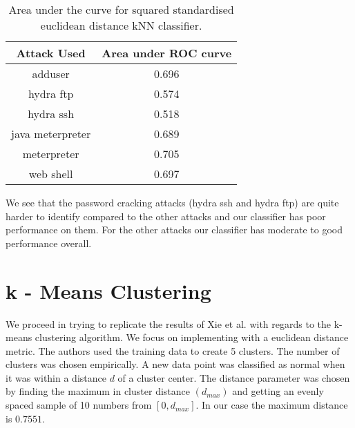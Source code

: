 \documentclass[reqno,openany,12pt]{amsbook}
\begin{document}
\begin{table}
\begin{tabular}{|c|c|}
\hline
Attack Used &  Area under ROC curve \\ \hline 
adduser          & 0.696 \\ \hline
hydra ftp        & 0.574 \\ \hline
hydra ssh        & 0.518 \\ \hline
java meterpreter & 0.689 \\ \hline
meterpreter      & 0.705 \\ \hline
web shell        & 0.697 \\ \hline
\end{tabular}
\vspace{5pt}
\caption{Area under the curve for squared standardised euclidean distance kNN classifier.}
\label{knnt4}
\end{table}

We see that the password cracking attacks (hydra ssh and hydra ftp) are quite harder to identify compared to the other attacks and our classifier has poor performance on them. For the other attacks our classifier has moderate to good performance overall.



\section{k - Means Clustering}


We proceed in trying to replicate the results of Xie et al.\cite{adf1} with regards to the k-means clustering algorithm. We focus on implementing with a euclidean distance metric. The authors used the training data to create 5 clusters. The number of clusters was chosen empirically. A new data point was classified as normal when it was within a distance $d$ of a cluster center. The distance parameter was chosen by finding the maximum in cluster distance $(d_{max})$ and getting an evenly spaced sample of 10 numbers from $[0,d_{max}]$. In our case the maximum distance is $0.7551$.
\end{document}
